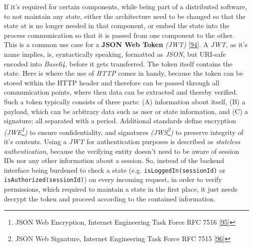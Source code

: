 \documentclass[12pt,english,a4paper,titlepage,cleardoublepage=empty,dottedtoc]{report}
\begin{document}
If it's required for certain components, while being part of a
distributed software, to not maintain any state, either the architecture
need to be changed so that the state at is no longer needed in that
component, or embed the state into the process communication so that it
is passed from one component to the other. This is a common use case for
a \textbf{\protect\hypertarget{def--jwt}{}{JSON Web Token}} \emph{(JWT)}
{[}\protect\hyperlink{ref-web_spec_json-web-token}{94}{]}. A \emph{JWT},
as it's name implies, is, syntactically speaking, formatted as
\emph{JSON}, but URI-safe encoded into \emph{Base64}, before it gets
transferred. The token itself contains the state. Here is where the use
of \emph{HTTP} comes in handy, because the token can be stored within
the HTTP header and therefore can be passed through all communication
points, where then data can be extracted and thereby verified. Such a
token typically consists of three parts: (A) information about itself,
(B) a payload, which can be arbitrary data such as user or state
information, and (C) a signature; all separated with a period.
Additional standards define encryption \emph{(JWE\footnote{JSON Web
  Encryption, Internet Engineering Task Force RFC 7516
  {[}\protect\hyperlink{ref-web_spec_json-web-encryption}{95}{]}})} to
ensure confidentiality, and signatures \emph{(JWS\footnote{JSON Web
  Signature, Internet Engineering Task Force RFC 7515
  {[}\protect\hyperlink{ref-web_spec_json-web-signature}{96}{]}})} to
preserve integrity of it's contents. Using a \emph{JWT} for
authentication purposes is described as \emph{stateless authentication},
because the verifying entity doesn't need to be aware of session IDs nor
any other information about a session. So, instead of the backend
interface being burdened to check a state (e.g.
\texttt{isLoggedIn(sessionId)} or \texttt{isAuthorized(sessionId)}) on
every incoming request, in order to verify permissions, which required
to maintain a state in the first place, it just needs decrypt the token
and proceed according to the contained information.
\end{document}
